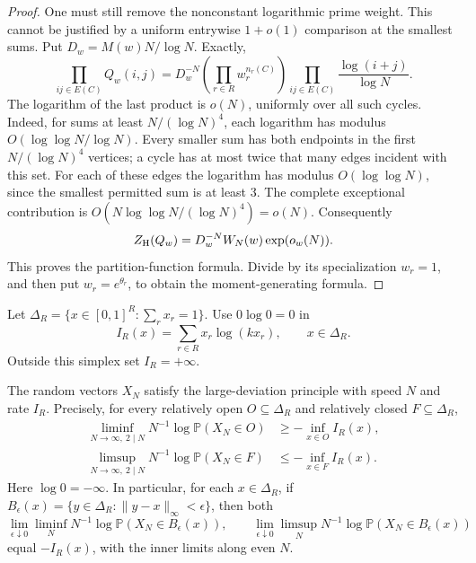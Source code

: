 \begin{proof}
One must still remove the nonconstant logarithmic prime weight.
This cannot be justified by a uniform entrywise \(1+o(1)\)
comparison at the smallest sums.
Put \(D_w=M(w)N/\log N\). Exactly,
\[
 \prod_{ij\in E(C)}Q_w(i,j)
 =D_w^{-N}\left(\prod_{r\in R}w_r^{n_r(C)}\right)
             \prod_{ij\in E(C)}\frac{\log(i+j)}{\log N}.
\]
The logarithm of the last product is \(o(N)\), uniformly
over all such cycles.
Indeed, for sums at least \(N/(\log N)^4\), each logarithm
has modulus \(O(\log\log N/\log N)\).
Every smaller sum has both endpoints in the first
\(N/(\log N)^4\) vertices; a cycle has at most twice that
many edges incident with this set.
For each of these edges the logarithm has modulus
\(O(\log\log N)\), since the smallest permitted sum is at least 3.
The complete exceptional contribution is
\(O(N\log\log N/(\log N)^4)=o(N)\).
Consequently
\[
 Z_{\rm H}(Q_w)=D_w^{-N}W_N(w)\exp(o_w(N)).
\]
This proves the partition-function formula.
Divide by its specialization \(w_r=1\), and then put
\(w_r=e^{\theta_r}\), to obtain the moment-generating formula.
\end{proof}

Let \(\Delta_R=\{x\in[0,1]^R:\sum_rx_r=1\}\).
Use \(0\log0=0\) in
\[
 I_R(x)=\sum_{r\in R}x_r\log(kx_r),\qquad x\in\Delta_R.
\]
Outside this simplex set \(I_R=+\infty\).

\begin{theorem}
\label{thm:residueldp}
The random vectors \(X_N\) satisfy the large-deviation principle
with speed \(N\) and rate \(I_R\).
Precisely, for every relatively open \(O\subseteq\Delta_R\)
and relatively closed \(F\subseteq\Delta_R\),
\[
 \begin{split}
 \liminf_{N\to\infty,\ 2\mid N}
       N^{-1}\log\mathbb P(X_N\in O)&\geq-\inf_{x\in O}I_R(x),\\
 \limsup_{N\to\infty,\ 2\mid N}
       N^{-1}\log\mathbb P(X_N\in F)&\leq-\inf_{x\in F}I_R(x).
 \end{split}
\]
Here \(\log0=-\infty\).
In particular, for each \(x\in\Delta_R\), if
\(B_\epsilon(x)=\{y\in\Delta_R:\|y-x\|_\infty<\epsilon\}\),
then both
\[
 \lim_{\epsilon\downarrow0}\liminf_N
       N^{-1}\log\mathbb P(X_N\in B_\epsilon(x)),
 \qquad
 \lim_{\epsilon\downarrow0}\limsup_N
       N^{-1}\log\mathbb P(X_N\in B_\epsilon(x))
\]
equal \(-I_R(x)\), with the inner limits along even \(N\).
\end{theorem}

